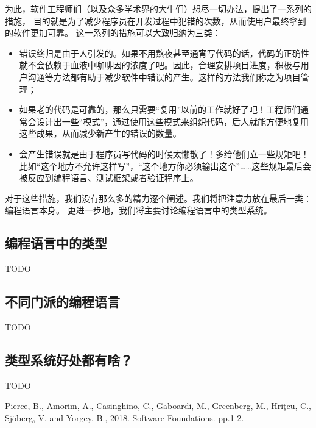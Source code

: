 \documentclass[../main.tex]{subfiles}
\begin{document}
  \indent 为此，软件工程师们（以及众多学术界的大牛们）想尽一切办法，提出了一系列的措施，
  目的就是为了减少程序员在开发过程中犯错的次数，从而使用户最终拿到的软件更加可靠。
  这一系列的措施可以大致归纳为三类：\cite{sf}
  \begin{itemize}
    \item 错误终归是由于人引发的。如果不用熬夜甚至通宵写代码的话，代码的正确性就不会依赖于血液中咖啡因的浓度了吧。因此，合理安排项目进度，积极与用户沟通等方法都有助于减少软件中错误的产生。这样的方法我们称之为项目管理；
    \item 如果老的代码是可靠的，那么只需要“复用”以前的工作就好了吧！工程师们通常会设计出一些“模式”，通过使用这些模式来组织代码，后人就能方便地复用这些成果，从而减少新产生的错误的数量。
    \item 会产生错误就是由于程序员写代码的时候太懒散了！多给他们立一些规矩吧！比如“这个地方不允许这样写”，“这个地方你必须输出这个”……这些规矩最后会被反应到编程语言、测试框架或者验证程序上。
  \end{itemize}

  \indent 对于这些措施，我们没有那么多的精力逐个阐述。我们将把注意力放在最后一类：编程语言本身。
  更进一步地，我们将主要讨论编程语言中的类型系统。

  \subsection{编程语言中的类型}
  TODO
  \subsection{不同门派的编程语言}
  TODO
  \subsection{类型系统好处都有啥？}
  TODO

  \begin{thebibliography}{1}
     Pierce, B., Amorim, A., Casinghino, C., Gaboardi, M., Greenberg, M., Hriţcu, C., Sjöberg, V. and Yorgey, B., 2018. Software Foundations. pp.1-2.
  \end{thebibliography}
\end{document}
